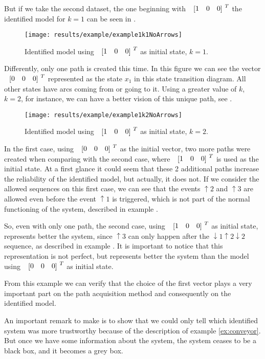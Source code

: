 But if we take the second dataset, the one beginning with $\colvec{1&0&0}^T$ the identified model for $k=1$ can be
seen in . 
\begin{figure}[H]
  \centering
  \texttt{[image: results/example/example1k1NoArrows]}
  \caption{Identified model using $\colvec{1&0&0}^T$ as initial state, $k=1$.}
    \label{fig:exampleCol100k1}
\end{figure}
Differently, only one path is created this time. In this figure we can see the vector $\colvec{0&0&0}^T$ represented as the state
$x_1$ in this state transition diagram. All other states have arcs coming
from or going to it. Using a greater value of $k$, $k=2$, for instance, we can have a
better vision of this unique path, see .
\begin{figure}[H]
  \centering
  \texttt{[image: results/example/example1k2NoArrows]}
  \caption{Identified model using $\colvec{1&0&0}^T$ as initial state, $k=2$.}
    \label{fig:exampleCol100k2}
  \end{figure}

  In the first case, using $\colvec{0&0&0}^T$ as the initial vector, two more
  paths were created when comparing with the second case, where
  $\colvec{1&0&0}^T$ is used as the initial state. At a first glance it could
  seem that these 2 additional paths increase the reliability of the identified model,
  but actually, it does not. If we consider the allowed
  sequences on this first case, we can see that the events $\uparrow 2$ and
  $\uparrow 3$ are allowed even before the event $\uparrow 1$ is triggered,
  which is not part of the normal functioning of the system, described in
  example .

  So, even with only one path, the second case, using $\colvec{1&0&0}^T$ as
  initial state, represents better the system, since $\uparrow 3$ can only happen
  after the $\downarrow 1\uparrow 2\downarrow 2$ sequence, as described in
  example . It is important to notice that this
  representation is not perfect, but represents better the system than the model
  using $\colvec{0&0&0}^T$ as initial state.

  From this example we can verify that the choice of the first vector plays a very important part on
  the
  path acquisition method and consequently on the identified
  model.
  \begin{observation}
    \label{obs:blackbox}
  An important remark to make is to show that we could only tell
  which identified system was more trustworthy because of the description of
  example \ref{ex:conveyor}. But once we have some information about the system,
  the system ceases to be a black box, and it becomes a grey box. 
\end{observation}

